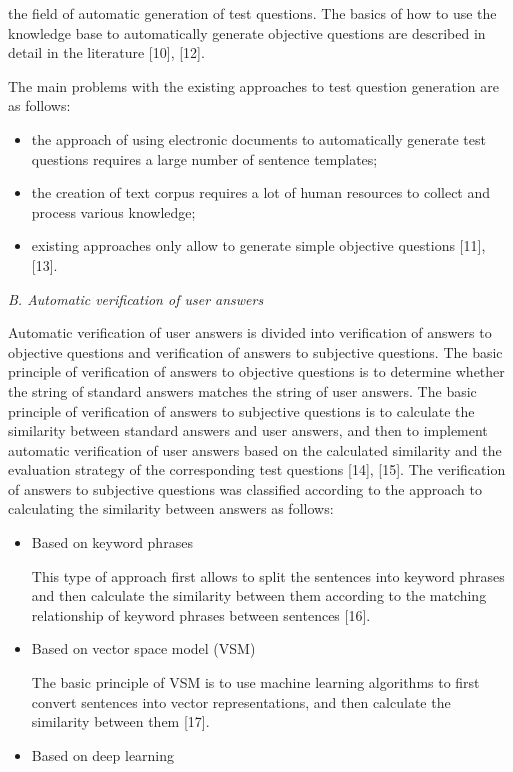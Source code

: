 \documentclass{article}
\begin{document}
\begin{multicols}{2}
\noindent the field of automatic generation of test questions. The
basics of how to use the knowledge base to automatically
generate objective questions are described in detail in the
literature [10], [12].

The main problems with the existing approaches to
test question generation are as follows:
    \begin{itemize}
        \item the approach of using electronic documents to automatically generate test questions requires a large number of sentence templates;
        \item the creation of text corpus requires a lot of human resources to collect and process various knowledge;
        \item existing approaches only allow to generate simple objective questions [11], [13].
    \end{itemize}

\noindent\textit{B. Automatic verification of user answers}

Automatic verification of user answers is divided into verification of answers to objective questions and verification of answers to subjective questions. The basic principle of verification of answers to objective questions is to determine whether the string of standard answers matches the string of user answers. The basic principle of verification of answers to subjective questions is to calculate the similarity between standard answers and user answers, and then to implement automatic verification of user answers based on the calculated similarity and the evaluation strategy of the corresponding test questions [14], [15]. The verification of answers to subjective questions was classified according to the approach to calculating the similarity between answers as follows:
    \begin{itemize}
        \item Based on keyword phrases
    
        This type of approach first allows to split the sentences into keyword phrases and then calculate the similarity between them according to the matching relationship of keyword phrases between sentences [16].
        \item Based on vector space model (VSM)
    
        The basic principle of VSM is to use machine learning algorithms to first convert sentences into vector representations, and then calculate the similarity between them [17].
        \item Based on deep learning 
    

\end{itemize}
\end{multicols}
\end{document}
